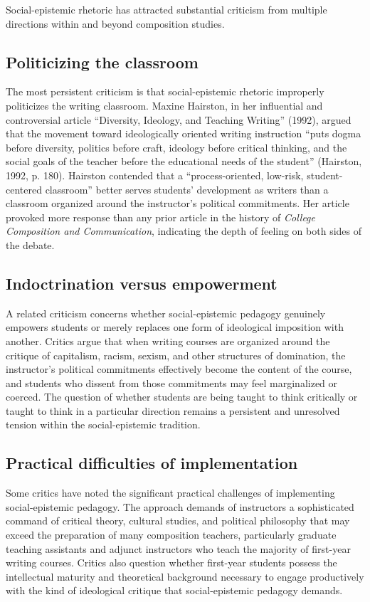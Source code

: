 \documentclass[12pt]{article}
\begin{document}
Social-epistemic rhetoric has attracted substantial criticism from multiple directions within and beyond composition studies.

\subsection*{Politicizing the classroom}

The most persistent criticism is that social-epistemic rhetoric improperly politicizes the writing classroom. Maxine Hairston, in her influential and controversial article ``Diversity, Ideology, and Teaching Writing'' (1992), argued that the movement toward ideologically oriented writing instruction ``puts dogma before diversity, politics before craft, ideology before critical thinking, and the social goals of the teacher before the educational needs of the student'' (Hairston, 1992, p. 180). Hairston contended that a ``process-oriented, low-risk, student-centered classroom'' better serves students' development as writers than a classroom organized around the instructor's political commitments. Her article provoked more response than any prior article in the history of \textit{College Composition and Communication}, indicating the depth of feeling on both sides of the debate.

\subsection*{Indoctrination versus empowerment}

A related criticism concerns whether social-epistemic pedagogy genuinely empowers students or merely replaces one form of ideological imposition with another. Critics argue that when writing courses are organized around the critique of capitalism, racism, sexism, and other structures of domination, the instructor's political commitments effectively become the content of the course, and students who dissent from those commitments may feel marginalized or coerced. The question of whether students are being taught to think critically or taught to think in a particular direction remains a persistent and unresolved tension within the social-epistemic tradition.

\subsection*{Practical difficulties of implementation}

Some critics have noted the significant practical challenges of implementing social-epistemic pedagogy. The approach demands of instructors a sophisticated command of critical theory, cultural studies, and political philosophy that may exceed the preparation of many composition teachers, particularly graduate teaching assistants and adjunct instructors who teach the majority of first-year writing courses. Critics also question whether first-year students possess the intellectual maturity and theoretical background necessary to engage productively with the kind of ideological critique that social-epistemic pedagogy demands.
\end{document}
